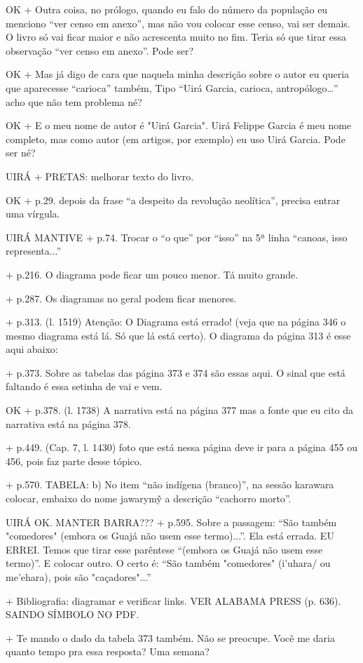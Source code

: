 OK + Outra coisa, no prólogo, quando eu falo do número da população eu menciono “ver censo em anexo”, mas não vou colocar esse censo, vai ser demais. O livro só vai ficar maior e não acrescenta muito no fim. 
Teria só que tirar essa observação “ver censo em anexo”. Pode ser?

OK + Mas já digo de cara que naquela minha descrição sobre o autor eu queria que aparecesse “carioca” também, Tipo “Uirá Garcia, carioca, antropólogo…” acho que não tem problema né?

OK + E o meu nome de autor é "Uirá Garcia". Uirá Felippe Garcia é meu nome completo, mas como autor (em artigos, por exemplo) eu uso Uirá Garcia. Pode ser né?

UIRÁ + PRETAS: melhorar texto do livro.

OK + p.29. depois da frase “a despeito da revolução neolítica”, precisa entrar uma vírgula.

UIRÁ MANTIVE + p.74. Trocar o “o que” por “isso” na 5ª linha “canoas, isso representa...”

+ p.216. O diagrama pode ficar um pouco menor. Tá muito grande.

+ p.287. Os diagramas no geral podem ficar menores.

+ p.313. (l. 1519) Atenção: O Diagrama está errado! (veja que na página 346 o mesmo diagrama está lá. Só que lá está certo). O diagrama da página 313 é esse aqui abaixo:

+ p.373. Sobre as tabelas das página 373 e 374 são essas aqui. O sinal que está faltando é essa setinha de vai e vem.

OK + p.378. (l. 1738) A narrativa está na página 377 mas a fonte que eu cito da narrativa está na página 378.

+ p.449. (Cap. 7, l. 1430) foto que está nessa página deve ir para a página 455 ou 456, pois faz parte desse tópico.

+ p.570. TABELA: 
b) No item “não indígena (branco)”, na sessão karawara colocar, embaixo do nome jawarymỹ a descrição “cachorro morto”.

UIRÁ OK. MANTER BARRA??? + p.595. Sobre a passagem: “São também "comedores" (embora os Guajá não usem esse termo)...”. Ela está errada. EU ERREI. Temos que tirar esse parêntese “(embora os Guajá não usem esse termo)”. E colocar outro. O certo é: “São também "comedores" (i’uhara/ ou me’ehara), pois são "caçadores"...”

+ Bibliografia: diagramar e verificar links. VER ALABAMA PRESS (p. 636). SAINDO SÍMBOLO NO PDF.

+ Te mando o dado da tabela 373 também. Não se preocupe.
Você me daria quanto tempo pra essa resposta? Uma semana?
